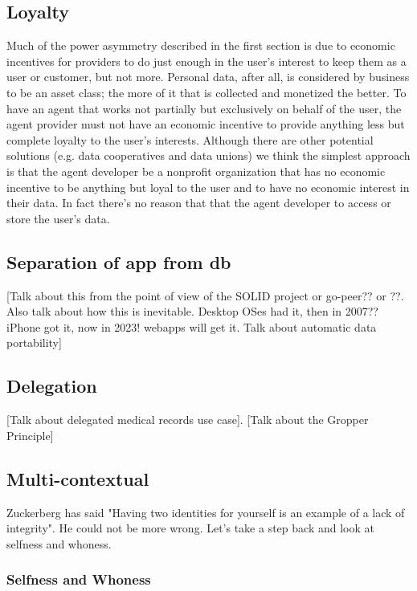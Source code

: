 \documentclass[11pt, oneside]{article}   	%
\begin{document}
\subsection{Loyalty}

Much of the power asymmetry described in the first section is due to economic incentives for providers to do just enough in the user's interest to keep them as a user or customer, but not more. Personal data, after all, is considered by business to be an asset class; the more of it that is collected and monetized the better. To have an agent that works not partially but exclusively on behalf of the user, the agent provider must not have an economic incentive to provide anything less but complete loyalty to the user's interests. Although there are other potential solutions (e.g. data cooperatives and data unions) we think the simplest approach is that the agent developer be a nonprofit organization that has no economic incentive to be anything but loyal to the user and to have no economic interest in their data. In fact there's no reason that that the agent developer to access or store the user's data.

\subsection{Separation of app from db}

[Talk about this from the point of view of the SOLID project or go-peer?? or ??. Also talk about how this is inevitable. Desktop OSes had it, then in 2007?? iPhone got it, now in 2023! webapps will get it. Talk about automatic data portability]

\subsection{Delegation}

[Talk about delegated medical records use case]. [Talk about the Gropper Principle]

\subsection{Multi-contextual}

Zuckerberg has said "Having two identities for yourself is an example of a lack of integrity"\cite{Kirkpatrick2011}. He could not be more wrong. Let's take a step back and look at selfness and whoness. 

\subsubsection{Selfness and Whoness}
\end{document}
